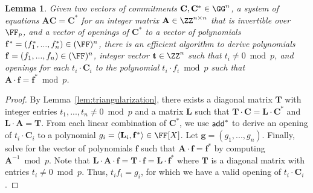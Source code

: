 \documentclass[12pt]{article}
\theoremstyle{Definition}
\newtheorem{lemma}{Lemma}
\begin{document}
\begin{lemma}\label{lem:extraction}
Given two vectors of commitments $\mathbf{C}, \mathbf{C^*} \in \G^n$, a system of equations $\mathbf{A} \mathbf{C} = \mathbf{C^*}$ for an integer matrix $\mathbf{A} \in \Z^{n \times n}$ that is invertible over $\F_p$, and a vector of openings of $\mathbf{C^*}$ to a vector of polynomials $\mathbf{f^*} = (f_1^*,...,f_n^*) \in (\FF)^n$, there is an efficient algorithm to derive polynomials $\mathbf{f} = (f_1,...,f_n) \in (\FF)^n$, integer vector $\mathbf{t} \in \Z^n$ such that $t_i \neq 0 \bmod p$, and openings for each $t_i \cdot \mathbf{C}_i$ to the polynomial $t_i \cdot f_i \bmod p$ such that $\mathbf{A} \cdot \mathbf{f} = \mathbf{f^*} \bmod p$. 
\end{lemma} 
\begin{proof} 
By Lemma~\ref{lem:triangularization}, there exists a diagonal matrix $\mathbf{T}$ with integer entries $t_1,...,t_n \neq 0 \bmod p$ and a matrix $\mathbf{L}$ such that $\mathbf{T} \cdot \mathbf{C} = \mathbf{L} \cdot \mathbf{C}^*$ and $\mathbf{L} \cdot \mathbf{A} = \mathbf{T}$. 
  From each linear combination of $\mathbf{C^*}$, we use $\textsf{add}^*$ to derive an opening of $t_i \cdot \mathbf{C}_i$ to a polynomial $g_i = \langle \mathbf{L}_i, \mathbf{f^*} \rangle \in \FX$.
   Let $\mathbf{g} = (g_1,...,g_n)$. Finally, solve for the vector of polynomials $\mathbf{f}$ such that $\mathbf{A} \cdot \mathbf{f} = \mathbf{f^*}$ by computing $\mathbf{A}^{-1} \bmod p$. Note that $\mathbf{L} \cdot \mathbf{A} \cdot \mathbf{f} = \mathbf{T} \cdot \mathbf{f} = \mathbf{L} \cdot \mathbf{f}^*$ where $\mathbf{T}$ is a diagonal matrix with entries $t_i \neq 0 \bmod p$. Thus, $t_i f_i = g_i$, for which we have a valid opening of $t_i \cdot \mathbf{C}_i$.   
\end{proof}


 
 
\end{document}
